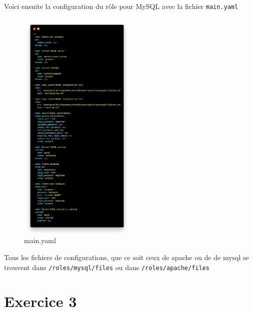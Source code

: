 \documentclass[12pt, a4paper]{article}
\begin{document}
\newpage
Voici ensuite la configuration du rôle pour MySQL avec la fichier 
\texttt{main.yaml}\\
\begin{figure}[h]
	\centering
	\includegraphics[width=0.5\textwidth]{img/mysql.png}
	\caption{main.yaml}
	\label{fig:1}
\end{figure}

Tous les fichiers de configurations, que ce soit ceux de apache ou de de mysql se trouvent dans 
\texttt{/roles/mysql/files} ou dans \texttt{/roles/apache/files}

\newpage
\section{Exercice 3}
\end{document}
